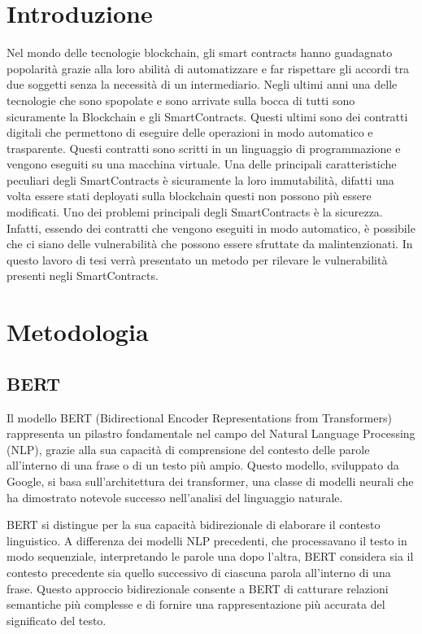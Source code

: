 \documentclass[12pt,a4paper]{report}
\begin{document}
\chapter{Introduzione}
Nel mondo delle tecnologie blockchain, gli smart contracts hanno guadagnato popolarità grazie alla loro abilità di automatizzare e far rispettare gli accordi tra due soggetti senza la necessità di un intermediario. 
Negli ultimi anni una delle tecnologie che sono spopolate e sono arrivate sulla bocca di tutti sono sicuramente la Blockchain e gli SmartContracts. Questi ultimi sono dei contratti digitali che permettono di eseguire delle operazioni in modo automatico e trasparente. Questi contratti sono scritti in un linguaggio di programmazione e vengono eseguiti su una macchina virtuale. Una delle principali caratteristiche peculiari degli SmartContracts è sicuramente la loro immutabilità, difatti una volta essere stati deployati sulla blockchain questi non possono più essere modificati.  Uno dei problemi principali degli SmartContracts è la sicurezza. Infatti, essendo dei contratti che vengono eseguiti in modo automatico, è possibile che ci siano delle vulnerabilità che possono essere sfruttate da malintenzionati. In questo lavoro di tesi verrà presentato un metodo per rilevare le vulnerabilità presenti negli SmartContracts. 



\chapter{Metodologia}
\section{BERT}
Il modello BERT (Bidirectional Encoder Representations from Transformers) rappresenta un pilastro fondamentale nel campo del Natural Language Processing (NLP), grazie alla sua capacità di comprensione del contesto delle parole all'interno di una frase o di un testo più ampio. Questo modello, sviluppato da Google, si basa sull'architettura dei transformer, una classe di modelli neurali che ha dimostrato notevole successo nell'analisi del linguaggio naturale.

BERT si distingue per la sua capacità bidirezionale di elaborare il contesto linguistico. A differenza dei modelli NLP precedenti, che processavano il testo in modo sequenziale, interpretando le parole una dopo l'altra, BERT considera sia il contesto precedente sia quello successivo di ciascuna parola all'interno di una frase. Questo approccio bidirezionale consente a BERT di catturare relazioni semantiche più complesse e di fornire una rappresentazione più accurata del significato del testo.
\end{document}
